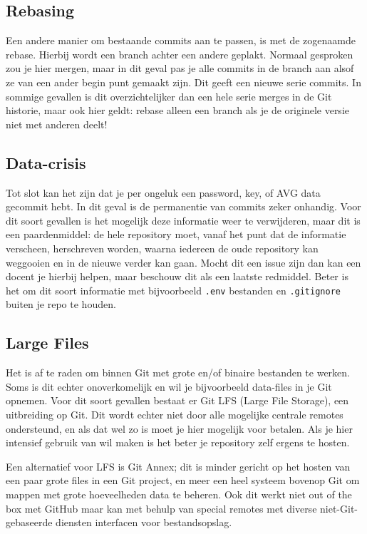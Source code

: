 \subsection{Rebasing} \label{sec:rebase}
Een andere manier om bestaande commits aan te passen, is met de zogenaamde rebase. Hierbij wordt een branch achter een andere geplakt. Normaal gesproken zou je hier mergen, maar in dit geval pas je alle commits in de branch aan alsof ze van een ander begin punt gemaakt zijn. Dit geeft een nieuwe serie commits. In sommige gevallen is dit overzichtelijker dan een hele serie merges in de Git historie, maar ook hier geldt: rebase alleen een branch als je de originele versie niet met anderen deelt!

\subsection{Data-crisis}
Tot slot kan het zijn dat je per ongeluk een password, key, of AVG data gecommit hebt. In dit geval is de permanentie van commits zeker onhandig. Voor dit soort gevallen is het mogelijk deze informatie weer te verwijderen, maar dit is een paardenmiddel: de hele repository moet, vanaf het punt dat de informatie verscheen, herschreven worden, waarna iedereen de oude repository kan weggooien en in de nieuwe verder kan gaan. Mocht dit een issue zijn dan kan een docent je hierbij helpen, maar beschouw dit als een laatste redmiddel. Beter is het om dit soort informatie met bijvoorbeeld \texttt{.env} bestanden en \texttt{.gitignore} buiten je repo te houden.

\subsection{Large Files}
Het is af te raden om binnen Git met grote en/of binaire bestanden te werken. Soms is dit echter onoverkomelijk en wil je bijvoorbeeld data-files in je Git opnemen. Voor dit soort gevallen bestaat er Git LFS (Large File Storage), een uitbreiding op Git. Dit wordt echter niet door alle mogelijke centrale remotes ondersteund, en als dat wel zo is moet je hier mogelijk voor betalen. Als je hier intensief gebruik van wil maken is het beter je repository zelf ergens te hosten.

Een alternatief voor LFS is Git Annex; dit is minder gericht op het hosten van een paar grote files in een Git project, en meer een heel systeem bovenop Git om mappen met grote hoeveelheden data te beheren. Ook dit werkt niet out of the box met GitHub maar kan met behulp van special remotes met diverse niet-Git-gebaseerde diensten interfacen voor bestandsopslag.
